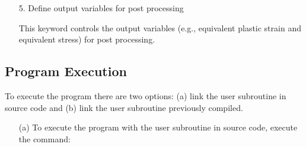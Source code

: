 \documentclass[11pt,a4paper,twoside,final,onecolumn,titlepage]{article}
\begin{document}
\begin{enumerate}
	\item[5.] Define output variables for post processing
	\item[] This keyword controls the output variables (e.g., equivalent plastic strain and equivalent stress) for post processing.\\
	\par
	\texttt{}
	\par\bigskip
\end{enumerate}

\vspace{0.2cm}
\subsection{Program Execution}
\vspace{0.2cm}

To execute the program there are two options: (a) link the user subroutine in source code and (b) link the user subroutine previously compiled.

\begin{enumerate}
	\item[(a)] To execute the program with the user subroutine in source code, execute the command:\\
	\par
	\texttt{}
	\par\bigskip
\end{enumerate}
\end{document}
